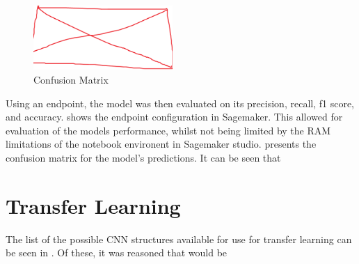 \begin{figure}[h]
    \centering
    \includegraphics[width=200px]{figures/placeholder.png} %
    \centering
    \caption{Confusion Matrix} %
    \label{fig:confusion_matrix} %
\end{figure}



Using an endpoint, the model was then evaluated on its precision, recall, f1 score, and accuracy.  shows the endpoint configuration in Sagemaker. This allowed for evaluation of the models performance, whilst not being limited by the RAM limitations of the notebook environent in Sagemaker studio.  presents the confusion matrix for the model's predictions. It can be seen that 


\section{Transfer Learning}

The list of the possible CNN structures available for use for transfer learning can be seen in \cite{keras_applications}. Of these, it was reasoned that  would be 